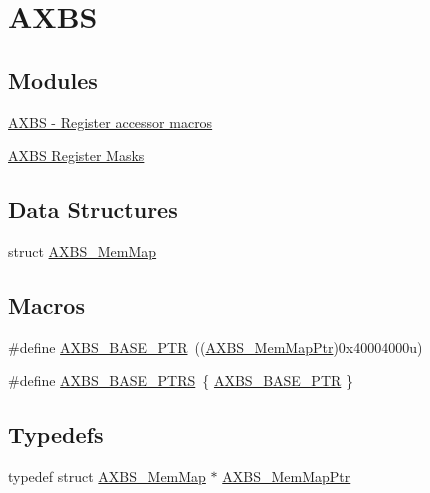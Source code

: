 \hypertarget{group___a_x_b_s___peripheral}{}\section{A\+X\+B\+S}
\label{group___a_x_b_s___peripheral}
\subsection*{Modules}
\begin{DoxyCompactItemize}
\item 
\hyperlink{group___a_x_b_s___register___accessor___macros}{A\+X\+B\+S -\/ Register accessor macros}
\item 
\hyperlink{group___a_x_b_s___register___masks}{A\+X\+B\+S Register Masks}
\end{DoxyCompactItemize}
\subsection*{Data Structures}
\begin{DoxyCompactItemize}
\item 
struct \hyperlink{struct_a_x_b_s___mem_map}{A\+X\+B\+S\+\_\+\+Mem\+Map}
\end{DoxyCompactItemize}
\subsection*{Macros}
\begin{DoxyCompactItemize}
\item 
\#define \hyperlink{group___a_x_b_s___peripheral_gacbbf56489b86d1ddb3e0ac291922a56d}{A\+X\+B\+S\+\_\+\+B\+A\+S\+E\+\_\+\+P\+T\+R}~((\hyperlink{group___a_x_b_s___peripheral_ga8f768bd75d5c94d51b05e9ef4a38ea33}{A\+X\+B\+S\+\_\+\+Mem\+Map\+Ptr})0x40004000u)
\item 
\#define \hyperlink{group___a_x_b_s___peripheral_ga522ab97d5ed3e73f1cb3591c40ecc50e}{A\+X\+B\+S\+\_\+\+B\+A\+S\+E\+\_\+\+P\+T\+R\+S}~\{ \hyperlink{group___a_x_b_s___peripheral_gacbbf56489b86d1ddb3e0ac291922a56d}{A\+X\+B\+S\+\_\+\+B\+A\+S\+E\+\_\+\+P\+T\+R} \}
\end{DoxyCompactItemize}
\subsection*{Typedefs}
\begin{DoxyCompactItemize}
\item 
typedef struct \hyperlink{struct_a_x_b_s___mem_map}{A\+X\+B\+S\+\_\+\+Mem\+Map} $\ast$ \hyperlink{group___a_x_b_s___peripheral_ga8f768bd75d5c94d51b05e9ef4a38ea33}{A\+X\+B\+S\+\_\+\+Mem\+Map\+Ptr}
\end{DoxyCompactItemize}


